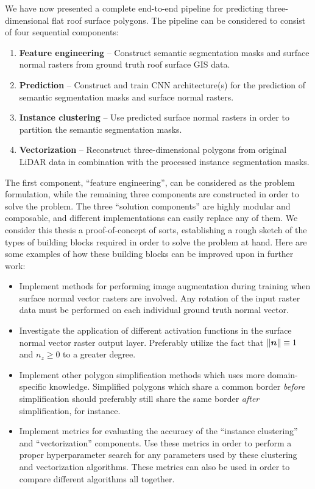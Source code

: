 We have now presented a complete end-to-end pipeline for predicting three-dimensional flat roof surface polygons.
The pipeline can be considered to consist of four sequential components:
%
\begin{enumerate}
  \item \textbf{Feature engineering} -- Construct semantic segmentation masks and surface normal rasters from ground truth roof surface GIS data.
  \item \textbf{Prediction} -- Construct and train CNN architecture(s) for the prediction of semantic segmentation masks and surface normal rasters.
  \item \textbf{Instance clustering} -- Use predicted surface normal rasters in order to partition the semantic segmentation masks.
  \item \textbf{Vectorization} -- Reconstruct three-dimensional polygons from original LiDAR data in combination with the processed instance segmentation masks.
\end{enumerate}
%
The first component, \enquote{feature engineering}, can be considered as the problem formulation, while the remaining three components are constructed in order to solve the problem.
The three \enquote{solution components} are highly modular and composable, and different implementations can easily replace any of them.
We consider this thesis a proof-of-concept of sorts, establishing a rough sketch of the types of building blocks required in order to solve the problem at hand.
Here are some examples of how these building blocks can be improved upon in further work:
%
\begin{itemize}
  \item Implement methods for performing image augmentation during training when surface normal vector rasters are involved.
    Any rotation of the input raster data must be performed on each individual ground truth normal vector.
  \item Investigate the application of different activation functions in the surface normal vector raster output layer.
    Preferably utilize the fact that $\left\lVert\boldsymbol{n}\right\rVert \equiv 1$ and $n_z \geq 0$ to a greater degree.
  \item Implement other polygon simplification methods which uses more domain-specific knowledge.
    Simplified polygons which share a common border \emph{before} simplification should preferably still share the same border \emph{after} simplification, for instance.
  \item Implement metrics for evaluating the accuracy of the \enquote{instance clustering} and \enquote{vectorization} components.
    Use these metrics in order to perform a proper hyperparameter search for any parameters used by these clustering and vectorization algorithms.
    These metrics can also be used in order to compare different algorithms all together.
\end{itemize}

